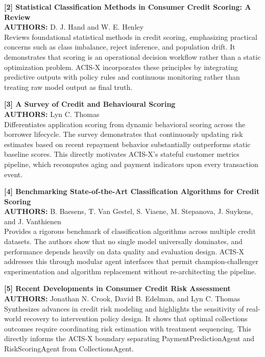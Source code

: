 \documentclass[a4paper, 12pt]{report}
\begin{document}
\noindent \textbf{[2] Statistical Classification Methods in Consumer Credit Scoring: A Review}\\
\textbf{AUTHORS:} D. J. Hand and W. E. Henley\\
Reviews foundational statistical methods in credit scoring, emphasizing practical concerns such as class imbalance, reject inference, and population drift. It demonstrates that scoring is an operational decision workflow rather than a static optimization problem. ACIS-X incorporates these principles by integrating predictive outputs with policy rules and continuous monitoring rather than treating raw model output as final truth.

\noindent \textbf{[3] A Survey of Credit and Behavioural Scoring}\\
\textbf{AUTHORS:} Lyn C. Thomas\\
Differentiates application scoring from dynamic behavioral scoring across the borrower lifecycle. The survey demonstrates that continuously updating risk estimates based on recent repayment behavior substantially outperforms static baseline scores. This directly motivates ACIS-X's stateful customer metrics pipeline, which recomputes aging and payment indicators upon every transaction event.

\noindent \textbf{[4] Benchmarking State-of-the-Art Classification Algorithms for Credit Scoring}\\
\textbf{AUTHORS:} B. Baesens, T. Van Gestel, S. Viaene, M. Stepanova, J. Suykens, and J. Vanthienen\\
Provides a rigorous benchmark of classification algorithms across multiple credit datasets. The authors show that no single model universally dominates, and performance depends heavily on data quality and evaluation design. ACIS-X addresses this through modular agent interfaces that permit champion-challenger experimentation and algorithm replacement without re-architecting the pipeline.

\noindent \textbf{[5] Recent Developments in Consumer Credit Risk Assessment}\\
\textbf{AUTHORS:} Jonathan N. Crook, David B. Edelman, and Lyn C. Thomas\\
Synthesizes advances in credit risk modeling and highlights the sensitivity of real-world recovery to intervention policy design. It shows that optimal collections outcomes require coordinating risk estimation with treatment sequencing. This directly informs the ACIS-X boundary separating PaymentPredictionAgent and RiskScoringAgent from CollectionsAgent.
\end{document}
